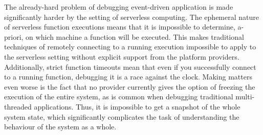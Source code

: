 The already-hard problem of debugging event-driven application is made
significantly harder by the setting of serverless computing. The ephemeral
nature of serverless function executions means that it is impossible to
determine, a-priori, on which machine a function will be executed. This makes
traditional techniques of remotely connecting to a running execution impossible
to apply to the serverless setting without explicit support from the platform
providers. Additionally, strict function timeouts mean that even if you
successfully connect to a running function, debugging it is a race against the
clock. Making matters even worse is the fact that no provider currently gives
the option of freezing the execution of the entire system, as is common when
debugging traditional multi-threaded applications. Thus, it is impossible to get
a snapshot of the whole system state, which significantly complicates the task
of understanding the behaviour of the system as a whole.



%
%
%

%
%
%
%
